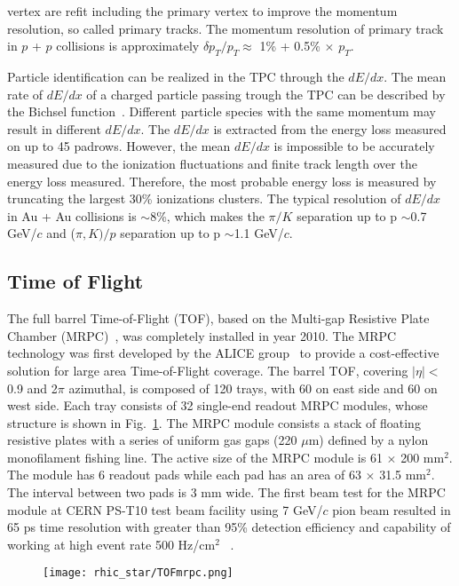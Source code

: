 vertex are refit including the primary vertex to improve the momentum resolution, so called primary tracks. The momentum resolution of primary track in $p$ + $p$ collisions is approximately $\delta p_{T}/p_{T} \approx$ 1\% + 0.5\% $\times$ $p_{T}$.

Particle identification can be realized in the TPC through the $dE/dx$. The mean rate of $dE/dx$ of a charged particle passing trough the TPC can be described by the Bichsel function~\cite{Bichsel}. Different particle species with the same momentum may result in different $dE/dx$. The $dE/dx$ is extracted from the energy loss measured on up to 45 padrows. However, the mean $dE/dx$ is impossible to be accurately measured due to the ionization fluctuations and finite track length over the energy loss measured. Therefore, the most probable energy loss is measured by truncating the largest 30\% ionizations clusters. The typical resolution of $dE/dx$ in Au + Au collisions is $\sim$8\%, which makes the $\pi/K$ separation up to p $\sim$0.7 GeV/$c$ and ($\pi,K)/p$ separation up to p $\sim$1.1 GeV/$c$.

\subsection{Time of Flight}

The full barrel Time-of-Flight (TOF), based on the Multi-gap Resistive Plate Chamber (MRPC)~\cite{STARTOFmrpc0}, was completely installed in year 2010. The MRPC technology was first developed by the ALICE group~\cite{ALICETOFmrpc} to provide a cost-effective solution for large area Time-of-Flight coverage. The barrel TOF, covering $|\eta|<$ 0.9 and 2$\pi$ azimuthal, is composed of 120 trays, with 60 on east side and 60 on west side. Each tray consists of 32 single-end readout MRPC modules, whose structure is shown in Fig.~\ref{tofmrpc}. The MRPC module consists a stack of floating resistive plates with a series of uniform gas gaps (220 $\mu$m) defined by a nylon monofilament fishing line. The active size of the MRPC module is 61 $\times$ 200 mm$^{2}$. The module has 6 readout pads while each pad has an area of 63 $\times$ 31.5 mm$^{2}$. The interval between two pads is 3 mm wide. The first beam test for the MRPC module at CERN PS-T10 test beam facility using 7 GeV/$c$ pion beam resulted in 65 ps time resolution with greater than 95\% detection efficiency and capability of working at high event rate 500 Hz/cm$^{2}$ ~\cite{STARTOFmrpc0, STARTOFmrpc1}.


\begin{figure}[htbp]
\centering
\texttt{[image: rhic\_star/TOFmrpc.png]}
 \label{tofmrpc}
\end{figure}

